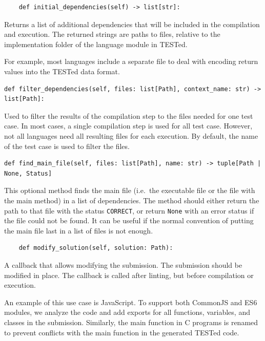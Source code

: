 \documentclass[../main]{subfiles}
\begin{document}
\begin{verbatim}
    def initial_dependencies(self) -> list[str]:
\end{verbatim}

Returns a list of additional dependencies that will be included in the compilation and execution.
The returned strings are paths to files, relative to the implementation folder of the language module in TESTed.

For example, most languages include a separate file to deal with encoding return values into the TESTed data format.

\begin{verbatim}
def filter_dependencies(self, files: list[Path], context_name: str) -> list[Path]:
\end{verbatim}

Used to filter the results of the compilation step to the files needed for one test case.
In most cases, a single compilation step is used for all test case.
However, not all languages need all resulting files for each execution.
By default, the name of the test case is used to filter the files.

\begin{verbatim}
def find_main_file(self, files: list[Path], name: str) -> tuple[Path | None, Status]
\end{verbatim}

This optional method finds the main file (i.e.\ the executable file or the file with the main method) in a list of dependencies.
The method should either return the path to that file with the status \texttt{CORRECT}, or return \texttt{None} with an error status if the file could not be found.
It can be useful if the normal convention of putting the main file last in a list of files is not enough.

\begin{verbatim}
    def modify_solution(self, solution: Path):
\end{verbatim}

A callback that allows modifying the submission.
The submission should be modified in place.
The callback is called after linting, but before compilation or execution.

An example of this use case is JavaScript.
To support both CommonJS and ES6 modules, we analyze the code and add exports for all functions, variables, and classes in the submission.
Similarly, the main function in C programs is renamed to prevent conflicts with the main function in the generated TESTed code.
\end{document}
